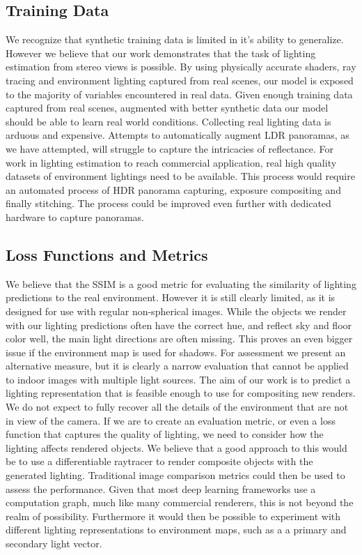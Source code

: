 \documentclass[ %
                    author={Gavin Parker},
                supervisor={Dr. Neill Campbell},
                    degree={MEng},
                     title={Deep Learning for Illumination Estimation from Stereo Images},
                  subtitle={},
                      type={Research},
                      year={2018} ]{dissertation}
\begin{document}
\subsection{Training Data}
We recognize that synthetic training data is limited in it's ability to generalize. However we believe that our work demonstrates that the task of lighting estimation from stereo views is possible. By using physically accurate shaders, ray tracing and environment lighting captured from real scenes, our model is exposed to the majority of variables encountered in real data. Given enough training data captured from real scenes, augmented with better synthetic data our model should be able to learn real world conditions. Collecting real lighting data is arduous and expensive. Attempts to automatically augment LDR panoramas, as we have attempted, will struggle to capture the intricacies of reflectance. For work in lighting estimation to reach commercial application, real high quality datasets of environment lightings need to be available. This process would require an automated process of HDR panorama capturing, exposure compositing and finally stitching. The process could be improved even further with dedicated hardware to capture panoramas.
\subsection{Loss Functions and Metrics}
We believe that the SSIM is a good metric for evaluating the similarity of lighting predictions to the real environment. However it is still clearly limited, as it is designed for use with regular non-spherical images. While the objects we render with our lighting predictions often have the correct hue, and reflect sky and floor color well, the main light directions are often missing. This proves an even bigger issue if the environment map is used for shadows. For assessment we present an alternative measure, but it is clearly a narrow evaluation that cannot be applied to indoor images with multiple light sources.
\newline
The aim of our work is to predict a lighting representation that is feasible enough to use for compositing new renders. We do not expect to fully recover all the details of the environment that are not in view of the camera. If we are to create an evaluation metric, or even a loss function that captures the quality of lighting, we need to consider how the lighting affects rendered objects. We believe that a good approach to this would be to use a differentiable raytracer to render composite objects with the generated lighting. Traditional image comparison metrics could then be used to assess the performance. Given that most deep learning frameworks use a computation graph, much like many commercial renderers, this is not beyond the realm of possibility. Furthermore it would then be possible to experiment with different lighting representations to environment maps, such as a a primary and secondary light vector.
\end{document}
